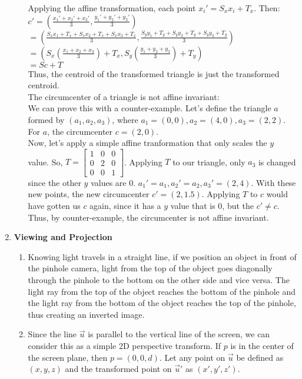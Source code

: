 \documentclass[12pt]{article}
\begin{document}
\begin{enumerate}
\begin{enumerate}
Applying the affine transformation, each point $x_i' = S_xx_i + T_x$. Then:\\
$c' = (\frac{x_1' + x_2' + x_3'}{3}, \frac{y_1' + y_2' + y_3'}{3})$\\$ = (\frac{S_xx_1 + T_x + S_xx_2 + T_x + S_xx_3 + T_x}{3}, \frac{S_yy_1 + T_y + S_yy_2 + T_y + S_yy_3 + T_y}{3})$\\$ = (S_x(\frac{x_1 + x_2 + x_3}{3}) + T_x, S_y(\frac{y_1 + y_2 + y_3}{3}) + T_y)$\\$ = Sc + T$\\
Thus, the centroid of the transformed triangle is just the transformed centroid.\\
The circumcenter of a triangle is not affine invariant:\\
We can prove this with a counter-example. Let's define the triangle $a$ formed by $(a_1,a_2,a_3)$, where $a_1 = (0,0), a_2 = (4,0), a_3 = (2,2)$. For $a$, the circumcenter $c = (2,0)$.\\
Now, let's apply a simple affine tranformation that only scales the $y$ value. So, $T = \begin{bmatrix}
1 & 0 & 0\\
0 & 2 & 0\\
0 & 0 & 1
\end{bmatrix}$. Applying $T$ to our triangle, only $a_3$ is changed since the other $y$ values are 0. $a_1' = a_1, a_2' = a_2, a_3' = (2,4)$. With these new points, the new circumcenter $c' = (2,1.5)$. Applying $T$ to $c$ would have gotten us $c$ again, since it has a $y$ value that is 0, but the $c'\neq c$. Thus, by counter-example, the circumcenter is not affine invariant.
\end{enumerate}
\item \textbf{Viewing and Projection}
\begin{enumerate}
\item %
Knowing light travels in a straight line, if we position an object in front of the pinhole camera, light from the top of the object goes diagonally through the pinhole to the bottom on the other side and vice versa. The light ray from the top of the object reaches the bottom of the pinhole and the light ray from the bottom of the object reaches the top of the pinhole, thus creating an inverted image.
\item %
Since the line $\vec{u}$ is parallel to the vertical line of the screen, we can consider this as a simple 2D perspective transform. If $p$ is in the center of the screen plane, then $p = (0,0,d)$. Let any point on $\vec{u}$ be defined as $(x,y,z)$ and the transformed point on $\vec{u}'$ as $(x',y',z')$.\\

\end{enumerate}
\end{enumerate}
\end{document}
